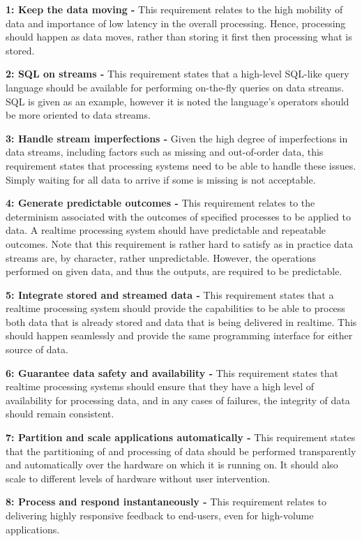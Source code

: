 \noindent \textbf{1: Keep the data moving -} This requirement relates to the high mobility of data and importance of low
latency in the overall processing. Hence, processing should happen as data moves, rather than storing it first then
processing what is stored.

\noindent \textbf{2: SQL on streams -} This requirement states that a high-level SQL-like query language should be
available for performing on-the-fly queries on data streams. SQL is given as an example, however it is noted the language's
operators should be more oriented to data streams.

\noindent \textbf{3: Handle stream imperfections -} Given the high degree of imperfections in data streams, including
factors such as missing and out-of-order data, this requirement states that processing systems need to be able to handle
these issues. Simply waiting for all data to arrive if some is missing is not acceptable.

\noindent \textbf{4: Generate predictable outcomes -} This requirement relates to the determinism associated with the
outcomes of specified processes to be applied to data. A realtime processing system should have predictable and repeatable
outcomes. Note that this requirement is rather hard to satisfy as in practice data streams are, by character, rather
unpredictable. However, the operations performed on given data, and thus the outputs, are required to be predictable.

\noindent \textbf{5: Integrate stored and streamed data -} This requirement states that a realtime processing system
should provide the capabilities to be able to process both data that is already stored and data that is being delivered
in realtime. This should happen seamlessly and provide the same programming interface for either source of data.

\noindent \textbf{6: Guarantee data safety and availability -} This requirement states that realtime processing systems
should ensure that they have a high level of availability for processing data, and in any cases of failures, the integrity
of data should remain consistent.

\noindent \textbf{7: Partition and scale applications automatically -} This requirement states that the partitioning of
and processing of data should be performed transparently and automatically over the hardware on which it is running on.
It should also scale to different levels of hardware without user intervention.

\noindent \textbf{8: Process and respond instantaneously -} This requirement relates to delivering highly responsive
feedback to end-users, even for high-volume applications.

